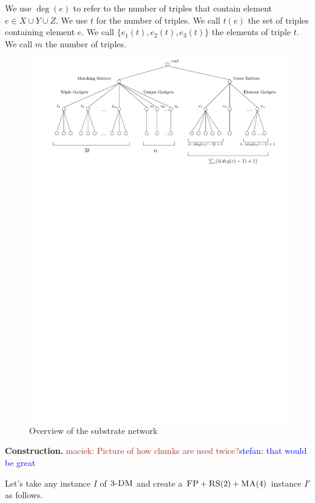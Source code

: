 \documentclass[preprint,12pt]{elsarticle}
\newcommand{\maciek}[1]{\textcolor{brown}{maciek: #1}}
\newcommand{\stefan}[1]{\textcolor{blue}{stefan: #1}}
\newcommand{\FP}{\textsc{FP}}
\newcommand{\RS}{\textsc{RS}}
\newcommand{\MA}{\textsc{MA}}
\newcommand{\TDM}{\textsc{3-DM}}
\begin{document}
We use $\deg(e)$ to refer to the number of triples that contain
element $e\in X\cup Y\cup Z$.  We use $t$ for the number of
triples. We call $t(e)$ the set of triples containing element $e$. We
call $\lbrace e_1(t), e_2(t), e_3(t) \rbrace$ the elements of triple
$t$.  We call $m$ the number of triples.

\begin{figure}[t]
  \centering
  \includegraphics[width=0.99\columnwidth]{reduction/overview.pdf}
  \vspace{-1em}
  \caption{Overview of the substrate network}
  \vspace{-1em}
\end{figure}


\textbf{Construction.}  \maciek{Picture of how chunks are used
  twice?}\stefan{that would be great}

Let's take any instance $I$ of $\TDM$ and create a $\FP+\RS(2)+\MA(4)$
instance $I'$ as follows.
\end{document}
